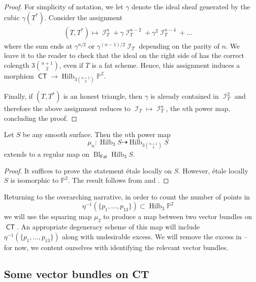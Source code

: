 \documentclass{article}
\renewcommand{\P}{\mathbb{P}}
\DeclareMathOperator{\Hilb}{Hilb}
\DeclareMathOperator{\I}{\mathcal{I}}
\DeclareMathOperator{\CT}{\mathsf{CT}}
\newcommand{\from}{\colon}
\DeclareMathOperator{\Fat}{\mathsf{Fat}}
\DeclareMathOperator{\Bl}{Bl}
\begin{document}
\begin{proof} For simplicity of notation, we let $\gamma$ denote the
  ideal sheaf generated by the cubic $\gamma(T^{*})$. Consider the
  assignment
  \begin{eqnarray}
    \label{eqn:modifiedideal}
  (T, T^{*}) \mapsto \I_{T}^{n} + \gamma \I_{T}^{n-2} + \gamma^{2}\I_{T}^{n-4} + ...
\end{eqnarray}
where the sum ends at $\gamma^{n/2}$ or $\gamma^{(n-1)/2}\I_{T}$
depending on the parity of $n$. We leave it to the reader to check
that the ideal on the right side of  has
the correct colength $3{n+1 \choose 2}$, even if $T$ is a fat
scheme. Hence, this assignment induces a morphism
$\CT \to \Hilb_{3 {n+1 \choose 2}}\P^{2}$.

Finally, if $(T, T^{*})$ is an honest triangle, then
$\gamma$ is already contained in $\I_{T}^{2}$ and therefore the
above assignment reduces to $\I_{T} \mapsto \I_{T}^{n}$,
 the $n$th power map, concluding the proof.
\end{proof}

\begin{corollary}
  \label{cor:AnySurface}
  Let $S$ be any smooth surface. Then the $n$th power map
  \[\mu_{n} \from \Hilb_{3}S \dashrightarrow \Hilb_{3 {n+1 \choose
      2}}S\] extends to  a regular map on $\Bl_{\Fat}\Hilb_{3}S$.
\end{corollary} 
\begin{proof}
  It suffices to prove the statement  \'etale locally on $S$.
  However, \'etale locally $S$ is isomorphic to $\P^{2}$.  The result
  follows from  and
  .
\end{proof}


Returning to the overarching narrative, in order to count the number of points in $$\eta^{-1}(\{p_{1}, \dots, p_{13}\}) \subset \Hilb_{3}\P^{2}$$ we will use the squaring map $\mu_{2}$ to
produce a map between two vector bundles on $\CT$.  An
appropriate degeneracy scheme of this map will include
$\eta^{-1}(\{p_{1}, \dots, p_{13}\})$ along with undesirable excess. We will remove the excess in  -- for now, we content ourselves with identifying the relevant vector bundles.



\subsection{Some vector bundles on CT}
\label{sec:vectorbundle}
\end{document}
